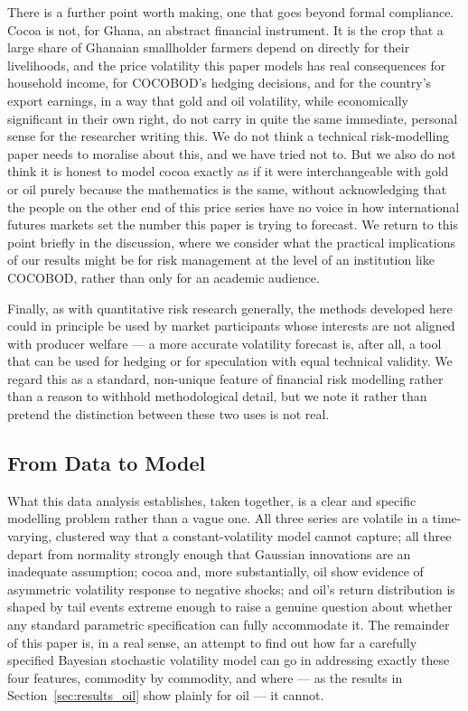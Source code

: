 \documentclass[preprint,12pt,authoryear]{elsarticle}
\begin{document}
There is a further point worth making, one that goes beyond formal
compliance. Cocoa is not, for Ghana, an abstract financial instrument.
It is the crop that a large share of Ghanaian smallholder farmers
depend on directly for their livelihoods, and the price volatility
this paper models has real consequences for household income, for
COCOBOD's hedging decisions, and for the country's export earnings, in
a way that gold and oil volatility, while economically significant in
their own right, do not carry in quite the same immediate, personal
sense for the researcher writing this. We do not think a technical
risk-modelling paper needs to moralise about this, and we have tried
not to. But we also do not think it is honest to model cocoa exactly
as if it were interchangeable with gold or oil purely because the
mathematics is the same, without acknowledging that the people on the
other end of this price series have no voice in how international
futures markets set the number this paper is trying to forecast. We
return to this point briefly in the discussion, where we consider what
the practical implications of our results might be for risk management
at the level of an institution like COCOBOD, rather than only for an
academic audience.

Finally, as with quantitative risk research generally, the methods
developed here could in principle be used by market participants whose
interests are not aligned with producer welfare — a more accurate
volatility forecast is, after all, a tool that can be used for hedging
or for speculation with equal technical validity. We regard this as a
standard, non-unique feature of financial risk modelling rather than a
reason to withhold methodological detail, but we note it rather than
pretend the distinction between these two uses is not real.

\subsection{From Data to Model}

What this data analysis establishes, taken together, is a clear and
specific modelling problem rather than a vague one. All three series
are volatile in a time-varying, clustered way that a constant-volatility
model cannot capture; all three depart from normality strongly enough
that Gaussian innovations are an inadequate assumption; cocoa and, more
substantially, oil show evidence of asymmetric volatility response to
negative shocks; and oil's return distribution is shaped by tail events
extreme enough to raise a genuine question about whether any standard
parametric specification can fully accommodate it. The remainder of
this paper is, in a real sense, an attempt to find out how far a
carefully specified Bayesian stochastic volatility model can go in
addressing exactly these four features, commodity by commodity, and
where --- as the results in Section~\ref{sec:results_oil} show plainly for oil --- it
cannot.
\end{document}
